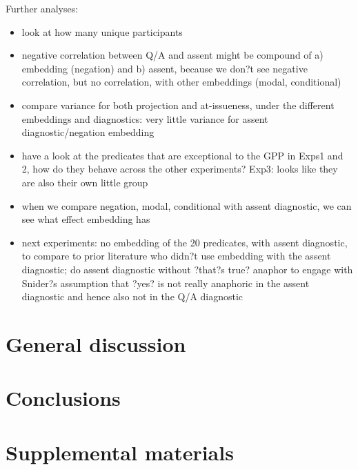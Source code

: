 \documentclass[11pt,fleqn]{article}
\newcommand{\6}{\mbox{$[\hspace*{-.6mm}[$}}
\newcommand{\9}{\mbox{$]\hspace*{-.6mm}]$}}
\begin{document}
\noindent Further analyses:
\begin{itemize}
  \item look at how many unique participants

  \item negative correlation between Q/A and assent might be compound of a) embedding (negation) and b) assent, because we don?t see negative correlation, but no correlation, with other embeddings (modal, conditional)

  \item  compare variance for both projection and at-issueness, under the different embeddings and diagnostics: very little variance for assent diagnostic/negation embedding

  \item have a look at the predicates that are exceptional to the GPP in Exps1 and 2, how do they behave across the other experiments? Exp3: looks like they are also their own little group

  \item  when we compare negation, modal, conditional with assent diagnostic, we can see what effect embedding has

  \item next experiments: no embedding of the 20 predicates, with assent diagnostic, to compare to prior literature who didn?t use embedding with the assent diagnostic; do assent diagnostic without ?that?s true? anaphor to engage with Snider?s assumption that ?yes? is not really anaphoric in the assent diagnostic and hence also not in the Q/A diagnostic

\end{itemize}

\section{General discussion}\label{s4}

\section{Conclusions}\label{s5}





\newpage

\section*{Supplemental materials}
\end{document}
